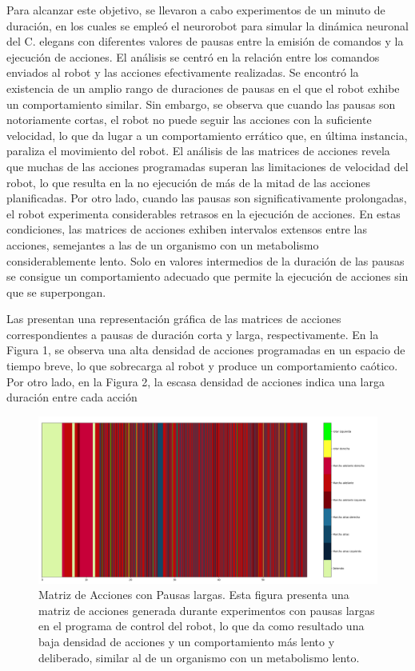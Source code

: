 Para alcanzar este objetivo, se llevaron a cabo experimentos de un minuto de duración, en los cuales se empleó el neurorobot para simular la dinámica neuronal del C. elegans con diferentes valores de pausas entre la emisión de comandos y la ejecución de acciones. El análisis se centró en la relación entre los comandos enviados al robot y las acciones efectivamente realizadas. Se encontró la  existencia de un amplio rango de duraciones de pausas en el que el robot exhibe un comportamiento similar. Sin embargo, se observa que cuando las pausas son notoriamente cortas, el robot no puede seguir las acciones con la suficiente velocidad, lo que da lugar a un comportamiento errático que, en última instancia, paraliza el movimiento del robot. El análisis de las matrices de acciones revela que muchas de las acciones programadas superan las limitaciones de velocidad del robot, lo que resulta en la no ejecución de más de la mitad de las acciones planificadas. Por otro lado, cuando las pausas son significativamente prolongadas, el robot experimenta considerables retrasos en la ejecución de acciones. En estas condiciones, las matrices de acciones exhiben intervalos extensos entre las acciones, semejantes a las de un organismo con un metabolismo considerablemente lento. Solo en valores intermedios de la duración de las pausas se consigue un comportamiento adecuado que permite la ejecución de acciones sin que se superpongan.

Las  presentan una representación gráfica de las matrices de acciones correspondientes a pausas de duración corta y larga, respectivamente. En la Figura 1, se observa una alta densidad de acciones programadas en un espacio de tiempo breve, lo que sobrecarga al robot y produce un comportamiento caótico. Por otro lado, en la Figura 2, la escasa densidad de acciones indica una larga duración entre cada acción



\begin{figure}[h!]
	\centering\includegraphics[width=\imsize]{pause_bajo.pdf}
	\caption[ Matriz de Acciones con Pausas largas.]{ Matriz de Acciones con Pausas largas. Esta figura presenta una matriz de acciones generada durante experimentos con pausas largas en el programa de control del robot, lo que da como resultado una baja densidad de acciones y un comportamiento más lento y deliberado, similar al de un organismo con un metabolismo lento.}\label{fig:pause_bajo}
\end{figure}


